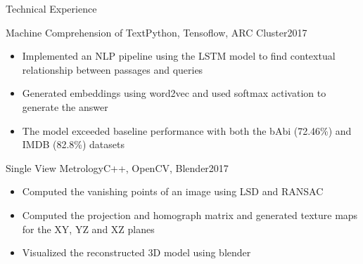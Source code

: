 \documentclass[]{mcdowellcv}
\begin{document}
	\vspace{-.2cm}
    
    \begin{cvsection}{Technical Experience}
		
        \vspace{.2cm}
        
        \begin{cvsubsection}{Machine Comprehension of Text}{Python, Tensoflow, ARC Cluster}{2017}
        
        	\vspace{-.3cm}
            
            \begin{itemize}
            	
                \item Implemented an NLP pipeline using the LSTM model to find contextual relationship between passages and queries
                
                \item Generated embeddings using word2vec and used softmax activation to generate the answer
                
                \item The model exceeded baseline performance with both the bAbi (72.46\%) and IMDB (82.8\%) datasets
                
            \end{itemize}
            
        \end{cvsubsection}
        
        \begin{cvsubsection}{Single View Metrology}{C++, OpenCV, Blender}{2017}
        
        	\vspace{-.2cm}
        
        	\begin{itemize}
            
            	\item Computed the vanishing points of an image using LSD and RANSAC
                \item Computed the projection and homograph matrix and generated texture maps for the XY, YZ and XZ planes
                \item Visualized the reconstructed 3D model using blender
            
            \end{itemize}
        

\end{cvsubsection}
\end{cvsection}
\end{document}
